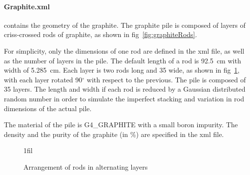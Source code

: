 \documentclass{article}
\makeatletter
\newcommand*{\centerfloat}{%
  \parindent \z@
  \leftskip \z@ \@plus 1fil \@minus \textwidth
  \rightskip\leftskip
  \parfillskip \z@skip}
\makeatother
\begin{document}
	\paragraph{Graphite.xml} contains the geometry of the graphite. The graphite pile is composed of layers of criss-crossed rods of graphite, as shown in fig~\ref{fig:graphiteRods}. 

	For simplicity, only the dimensions of one rod are defined in the xml file, as well as the number of layers in the pile. The default length of a rod is 92.5~cm with width of 5.285~cm. Each layer is two rods long and 35 wide, as shown in fig~\ref{fig:layers}, with each layer rotated 90$^{\circ}$ with respect to the previous. The pile is composed of 35 layers. The length and width if each rod is reduced by a Gaussian distributed random number in order to simulate the imperfect stacking and variation in rod dimensions of the actual pile. 

	The material of the pile is G4\_GRAPHITE with a small boron impurity. The density and the purity of the graphite (in \%) are specified in the xml file.


\begin{figure}[hbt]
	\centerfloat
	\caption{Arrangement of rods in alternating layers}	
	\label{fig:layers}
\end{figure}
\end{document}
